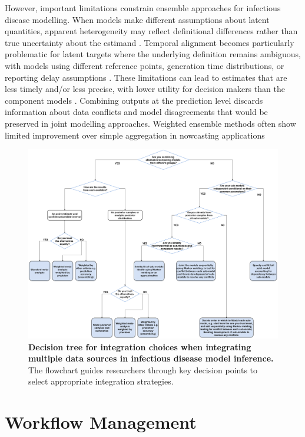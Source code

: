 \documentclass{article}
\begin{document}
However, important limitations constrain ensemble approaches for infectious disease modelling.
When models make different assumptions about latent quantities, apparent heterogeneity may reflect definitional differences rather than true uncertainty about the estimand \citep{brockhaus2023why}.
Temporal alignment becomes particularly problematic for latent targets where the underlying definition remains ambiguous, with models using different reference points, generation time distributions, or reporting delay assumptions \citep{brockhaus2023why}.
These limitations can lead to estimates that are less timely and/or less precise, with lower utility for decision makers than the component models \citep{manley2024combining}.
Combining outputs at the prediction level discards information about data conflicts and model disagreements that would be preserved in joint modelling approaches.
Weighted ensemble methods often show limited improvement over simple aggregation in nowcasting applications \citep{sherratt2021exploring}

\begin{figure}[htbp]
    \centering
    \includegraphics[width=\textwidth]{figures/integration choices decision tree.drawio.pdf}
    \caption{\textbf{Decision tree for integration choices when integrating multiple data sources in infectious disease model inference.} The flowchart guides researchers through key decision points to select appropriate integration strategies.}
    \label{fig:integration}
\end{figure}

\section{Workflow Management}
\end{document}
